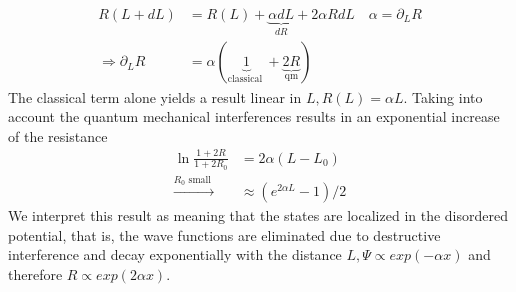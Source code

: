 \begin{equation}
\begin{aligned} R(L+d L) &=R(L)+\underbrace{\alpha d L}_{d R}+2 \alpha R d L \quad \alpha=\partial_{L} R \\ \Rightarrow \partial_{L} R &=\alpha(\underbrace{1}_{\text {classical }}+\underbrace{2 R}_{\mathrm{qm}}) \end{aligned}
\end{equation}
The classical term alone yields a result linear in $L, R (L) = \alpha L$. Taking into account the quantum mechanical interferences results in an exponential increase of the resistance
\begin{equation}
\begin{aligned} \ln \frac{1+2 R}{1+2 R_{0}} &=2 \alpha\left(L-L_{0}\right) \\ \overset{R_{0} \text { small }}{\to} & \approx\left(e^{2 \alpha L}-1\right) / 2 \end{aligned}
\end{equation}
We interpret this result as meaning that the states are localized in the disordered potential, that is, the wave functions are eliminated due to destructive interference and decay exponentially with the distance $L, \Psi \propto exp (-\alpha x)$ and therefore $R \propto exp (2\alpha x)$.

